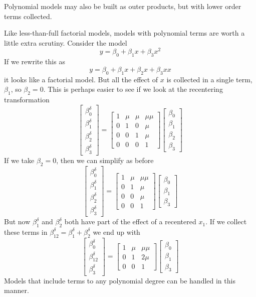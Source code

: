 \documentclass[]{article}
\begin{document}
Polynomial models may also be built as outer products, but with lower
order terms collected.

Like less-than-full factorial models, models with polynomial terms are
worth a little extra scrutiny. Consider the model
\[y = \beta_0 + \beta_1x + \beta_3x^2\] If we rewrite this as
\[y = \beta_0 + \beta_1x + \beta_2x +\beta_3xx\] it looks like a
factorial model. But all the effect of \(x\) is collected in a single
term, \(\beta_1\), so \(\beta_2=0\). This is perhaps easier to see if we
look at the recentering transformation
\[\begin{bmatrix}\beta_0^\delta \\ \beta_1^\delta \\ \beta_2^\delta \\ \beta_3^\delta \end{bmatrix}=
\begin{bmatrix} 1 & \mu &\mu &\mu\mu \\
  0 &1 &0 &\mu \\ 0 &0 &1 &\mu \\ 0 &0 &0 &1 \end{bmatrix}
\begin{bmatrix}\beta_0 \\ \beta_1 \\ \beta_2 \\ \beta_3  \end{bmatrix}\]
If we take \(\beta_2=0\), then we can simplify as before
\[\begin{bmatrix}\beta_0^\delta \\ \beta_1^\delta \\ \beta_2^\delta \\ \beta_3^\delta \end{bmatrix}=
\begin{bmatrix} 1 & \mu &\mu\mu \\
  0 &1 &\mu \\ 0 &0 &\mu \\ 0 &0 &1 \end{bmatrix}
\begin{bmatrix}\beta_0 \\ \beta_1 \\ \beta_3  \end{bmatrix}\] But now
\(\beta_1^\delta\) and \(\beta_2^\delta\) both have part of the effect
of a recentered \(x_1\). If we collect these terms in
\(\beta^\delta_{12}=\beta_{1}^\delta+\beta_{2}^\delta\) we end up with
\[\begin{bmatrix}\beta_0^\delta \\ \beta_{12}^\delta \\ \beta_3^\delta \end{bmatrix}=
\begin{bmatrix} 1 & \mu &\mu\mu \\
  0 &1 &2\mu \\ 0 &0 &1 \end{bmatrix}
\begin{bmatrix}\beta_0 \\ \beta_1 \\ \beta_3  \end{bmatrix}\] Models
that include terms to any polynomial degree can be handled in this
manner.
\end{document}
